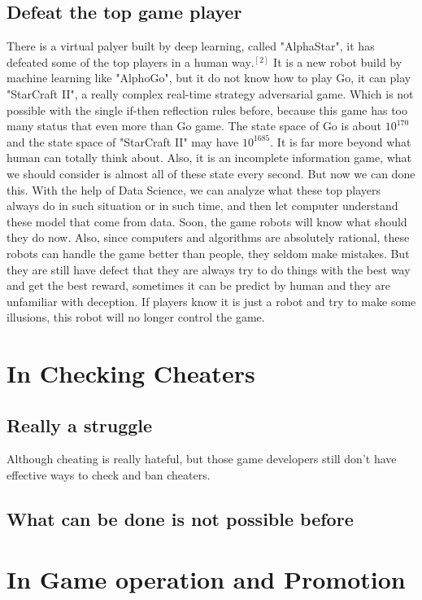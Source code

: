 \documentclass[12pt]{article}
\begin{document}
        \subsection{Defeat the top game player}
            There is a virtual palyer built by deep learning, called "AlphaStar", it
            has defeated some of the top players in a human way$.^{[2]}$ It is a new robot build by machine
            learning like "AlphoGo", but it do not know how to play Go, it can play
            "StarCraft II", a really complex real-time strategy adversarial game. Which is not
            possible with the single if-then reflection rules before, because this game has too
            many status that even more than Go game. The state space of Go is about $10^{170}$ and
            the state space of "StarCraft II" may have $10^{1685}$. It is far more beyond what
            human can totally think about. Also, it is an incomplete information game, what we should
            consider is almost all of these state every second. But now we can done this. With the help
            of Data Science, we can analyze what these top players always do in such situation or in
            such time, and then let computer understand these model that come from data. Soon, the
            game robots will know what should they do now. Also, since computers and algorithms are
            absolutely rational, these robots can handle the game better than people, they seldom
            make mistakes. But they are still have defect that they are always try to do things
            with the best way and get the best reward, sometimes it can be predict by human and they
            are unfamiliar with deception. If players know it is just a robot and try to make some
            illusions, this robot will no longer control the game.
    \section{In Checking Cheaters}
        \subsection{Really a struggle}
            Although cheating is really hateful, but those game developers still don't have effective
            ways to check and ban cheaters.
        \subsection{What can be done is not possible before}
    \section{In Game operation and Promotion}
\end{document}
